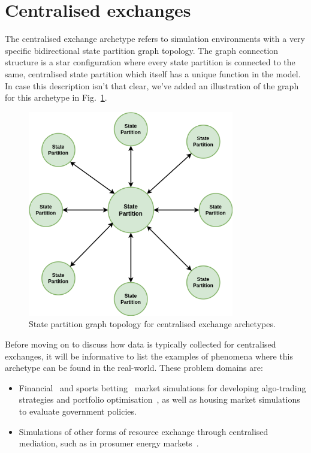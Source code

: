 \section{\sffamily Centralised exchanges}

The centralised exchange archetype refers to simulation environments with a very specific bidirectional state partition graph topology. The graph connection structure is a star configuration where every state partition is connected to the same, centralised state partition which itself has a unique function in the model. In case this description isn't that clear, we've added an illustration of the graph for this archetype in Fig.~\ref{fig:state-partition-graph-centralised-exchanges}.

\begin{figure}[h]
\centering
\includegraphics[width=9cm]{images/chapter-10-state-partition-graph.drawio.png}
\caption{State partition graph topology for centralised exchange archetypes.}
\label{fig:state-partition-graph-centralised-exchanges}
\end{figure}

Before moving on to discuss how data is typically collected for centralised exchanges, it will be informative to list the examples of phenomena where this archetype can be found in the real-world. These problem domains are:
\begin{itemize}
\item{Financial~\cite{fischer2018reinforcement,meng2019reinforcement} and sports betting~\cite{cliff2021bbe} market simulations for developing algo-trading strategies and portfolio optimisation~\cite{dangi2013financial}, as well as housing market simulations~\cite{yilmaz2018stochastic,carro2023heterogeneous} to evaluate government policies.}
\item{Simulations of other forms of resource exchange through centralised mediation, such as in prosumer energy markets~\cite{may2023multi}.} 
\end{itemize}

